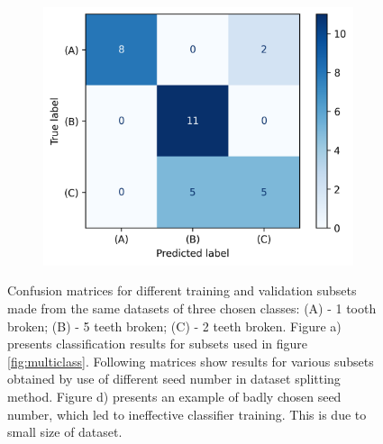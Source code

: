 \documentclass[energies,article,submit,pdftex,moreauthors]{Definitions/mdpi}
\begin{document}
\begin{figure}[t!]
    \begin{subfigure}[t]{0.3\textwidth}
        \centering
        \includegraphics[width=\linewidth]{images/confusion_matrix_multiclass_5}
        \caption{}
    \end{subfigure}
    
    \caption{Confusion matrices for different training and validation subsets made from the same datasets of three chosen classes: (A) - 1 tooth broken; (B) - 5 teeth broken; (C) - 2 teeth broken. Figure a) presents classification results for subsets used in figure \ref{fig:multiclass}. Following matrices show results for various subsets obtained by use of different seed number in dataset splitting method. Figure d) presents an example of badly chosen seed number, which led to ineffective classifier training. This is due to small size of dataset. \label{fig:confusion}}
\end{figure}
\unskip
\vspace{5mm}





\end{document}
